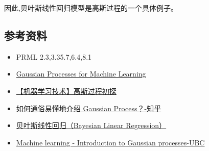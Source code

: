\documentclass[UTF8,a4paper]{ctexart}
\begin{document}
        因此,贝叶斯线性回归模型是高斯过程的一个具体例子。

        \subsection{参考资料}
        \begin{itemize}
            \item PRML 2.3,3.35.7,6.4,8.1
            \item \href{http://www.gaussianprocess.org/gpml/}{Gaussian Processes for Machine Learning}
            \item \href{http://blog.csdn.net/jasonding1354/article/details/49818575}{【机器学习技术】高斯过程初探}
            \item \href{https://www.zhihu.com/question/46631426}{如何通俗易懂地介绍 Gaussian Process？-知乎}
            \item \href{http://blog.csdn.net/daunxx/article/details/51725086}{贝叶斯线性回归（Bayesian Linear Regression）}
            \item \href{http://www.youtube.com/watch?v=4vGiHC35j9s}{Machine learning - Introduction to Gaussian processes-UBC}
        \end{itemize}
\end{document}
